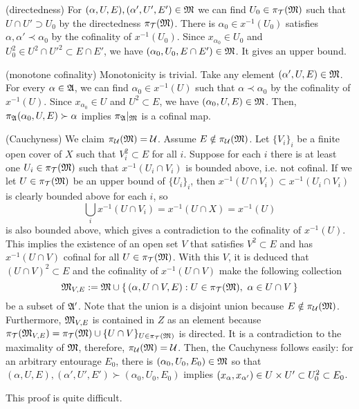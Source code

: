 \documentclass{../exp}
\begin{document}
\begin{pf}[1 of Theorem 1.1]
(directedness)
For $(\alpha,U,E),(\alpha',U',E')\in\mathfrak{M}$ we can find $U_0\in\pi_{\mathcal{T}}(\mathfrak{M})$ such that $U\cap U'\supset U_0$ by the directedness $\pi_{\mathcal{T}}(\mathfrak{M})$.
There is $\alpha_0\in x^{-1}(U_0)$ satisfies $\alpha,\alpha'\prec\alpha_0$ by the cofinality of $x^{-1}(U_0)$.
Since $x_{\alpha_0}\in U_0$ and $U_0^2\in U^2\cap U'^2\subset E\cap E'$, we have $(\alpha_0,U_0,E\cap E')\in\mathfrak{M}$.
It gives an upper bound.

(monotone cofinality)
Monotonicity is trivial.
Take any element $(\alpha',U,E)\in\mathfrak{M}$.
For every $\alpha\in\mathfrak{A}$, we can find $\alpha_0\in x^{-1}(U)$ such that $\alpha\prec\alpha_0$ by the cofinality of $x^{-1}(U)$.
Since $x_{\alpha_0}\in U$ and $U^2\subset E$, we have $(\alpha_0,U,E)\in\mathfrak{M}$.
Then, $\pi_{\mathfrak{A}}(\alpha_0,U,E)\succ\alpha$ implies $\pi_{\mathfrak{A}}|_{\mathfrak{M}}$ is a cofinal map.

(Cauchyness)
We claim $\pi_{\mathcal{U}}(\mathfrak{M})=\mathcal{U}$.
Assume $E\notin\pi_{\mathcal{U}}(\mathfrak{M})$.
Let $\{V_i\}_i$ be a finite open cover of $X$ such that $V_i^2\subset E$ for all $i$.
Suppose for each $i$ there is at least one $U_i\in\pi_{\mathcal{T}}(\mathfrak{M})$ such that $x^{-1}(U_i\cap V_i)$ is bounded above, i.e. not cofinal.
If we let $U\in\pi_{\mathcal{T}}(\mathfrak{M})$ be an upper bound of $\{U_i\}_i$, then $x^{-1}(U\cap V_i)\subset x^{-1}(U_i\cap V_i)$ is clearly bounded above for each $i$, so
\[\bigcup_ix^{-1}(U\cap V_i)=x^{-1}(U\cap X)=x^{-1}(U)\]
is also bounded above, which gives a contradiction to the cofinality of $x^{-1}(U)$.
This implies the existence of an open set $V$ that satisfies $V^2\subset E$ and has $x^{-1}(U\cap V)$ cofinal for all $U\in\pi_{\mathcal{T}}(\mathfrak{M})$.
With this $V$, it is deduced that $(U\cap V)^2\subset E$ and the cofinality of $x^{-1}(U\cap V)$ make the following collection
\[\mathfrak{M}_{V,E}:=\mathfrak{M}\cup\{\,(\alpha,U\cap V,E):U\in\pi_{\mathcal{T}}(\mathfrak{M}),\ \alpha\in U\cap V\,\}\]
be a subset of $\mathfrak{A}'$.
Note that the union is a disjoint union because $E\notin\pi_{\mathcal{U}}(\mathfrak{M})$.
Furthermore, $\mathfrak{M}_{V,E}$ is contained in $Z$ as an element because $\pi_{\mathcal{T}}(\mathfrak{M}_{V,E})=\pi_{\mathcal{T}}(\mathfrak{M})\cup\{U\cap V\}_{U\in\pi_{\mathcal{T}}(\mathfrak{M})}$ is directed.
It is a contradiction to the maximality of $\mathfrak{M}$, therefore, $\pi_{\mathcal{U}}(\mathfrak{M})=\mathcal{U}$.
Then, the Cauchyness follows easily: for an arbitrary entourage $E_0$, there is $(\alpha_0,U_0,E_0)\in\mathfrak{M}$ so that $(\alpha,U,E),(\alpha',U',E')\succ(\alpha_0,U_0,E_0)$ implies $(x_\alpha,x_{\alpha'})\in U\times U'\subset U_0^2\subset E_0$.
\end{pf}

This proof is quite difficult.
\end{document}
